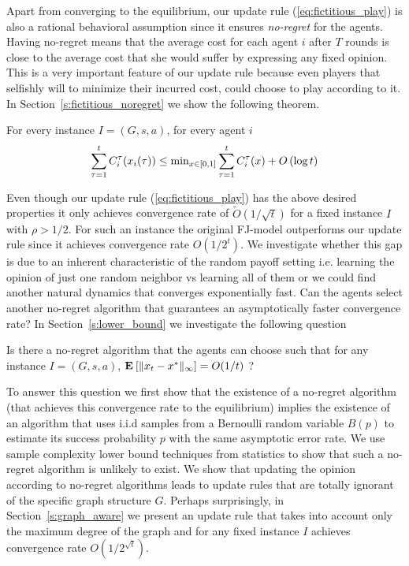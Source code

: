 Apart from converging to the equilibrium, our update rule
(\ref{eq:fictitious_play}) is also a rational behavioral
assumption since it ensures \emph{no-regret} for the agents.
Having no-regret means that the average cost for each agent $i$
after $T$ rounds is close to the average cost that she would
suffer by expressing any fixed opinion. This is a very important
feature of our update rule because even players that selfishly
will to minimize their incurred cost, could choose to play according
to it. In Section~\ref{s:fictitious_noregret} we show the following
theorem.
\begin{theorem}\label{t:fictitious_noregret}

  For every instance $I=(G,s,a)$, for every agent $i$
  $$\sum_{\tau=1}^tC_i^\tau(x_i(\tau)) \leq \text{min}_{x \in
    [0,1]}\sum_{\tau=1}^tC_i^\tau(x) + O\left(\log t\right)$$

\end{theorem}

Even though our update rule (\ref{eq:fictitious_play}) has the above
desired properties it only achieves convergence rate of
$\widetilde{O}(1/\sqrt{t})$ for a fixed instance $I$ with
$\rho>1/2$.  For such an instance the original FJ-model outperforms
our update rule since it achieves convergence rate $O(1/2^{t})$.
We investigate whether this gap is due to an inherent characteristic
of the random payoff setting i.e. learning the opinion of just one random
neighbor vs learning all of them or we could find another natural dynamics
that converges exponentially fast. Can the agents select another no-regret
algorithm that guarantees an asymptotically faster convergence rate?
In Section~\ref{s:lower_bound} we investigate the following question

\begin{question}
  Is there a no-regret algorithm that the agents can choose such that
  for any instance $I = (G, s, a)$, $\Exp{\norm{\infty}{x_t - x^*}} = O(1/t)$ ?
\end{question}

To answer this question we first show that the existence of a no-regret
algorithm (that achieves this convergence rate to the equilibrium) implies
the existence of an algorithm that uses i.i.d samples from a Bernoulli random
variable $B(p)$ to estimate its success probability $p$ with the same asymptotic
error rate. We use sample complexity lower bound techniques from statistics
to show that such a no-regret algorithm is unlikely to exist.
We show that updating the opinion according to no-regret algorithms leads
to update rules that are totally ignorant of the specific graph structure $G$.
Perhaps surprisingly, in Section~\ref{s:graph_aware} we present an update rule
that takes into account only the maximum degree of the graph and for any
fixed instance $I$ achieves convergence rate $O(1/2^{\sqrt{t}})$.


